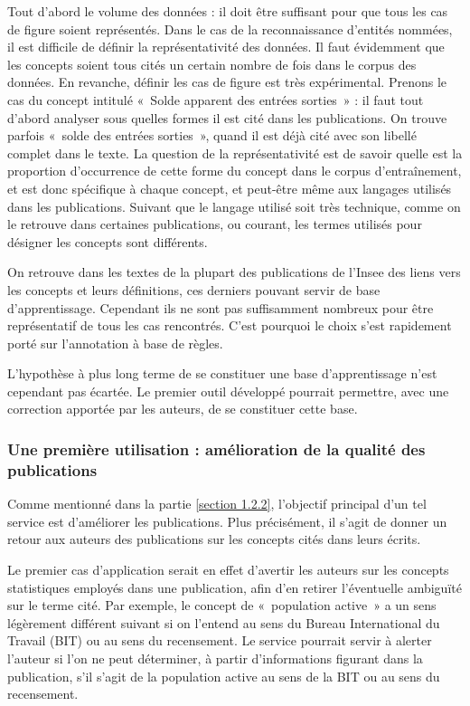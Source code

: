 Tout d'abord le volume des données : il doit être suffisant pour que tous les cas de figure soient représentés. Dans le cas de la reconnaissance d'entités nommées, il est difficile de définir la représentativité des données. Il faut évidemment que les concepts soient tous cités un certain nombre de fois dans le corpus des données. En revanche, définir les cas de figure est très expérimental. Prenons le cas du concept intitulé «~Solde apparent des entrées sorties~» : il faut tout d'abord analyser sous quelles formes il est cité dans les publications. On trouve parfois «~solde des entrées sorties~», quand il est déjà cité avec son libellé complet dans le texte. La question de la représentativité est de savoir quelle est la proportion d'occurrence de cette forme du concept dans le corpus d'entraînement, et est donc spécifique à chaque concept, et peut-être même aux langages utilisés dans les publications. Suivant que le langage utilisé soit très technique, comme on le retrouve dans certaines publications, ou courant, les termes utilisés pour désigner les concepts sont différents.
\newline

On retrouve dans les textes de la plupart des publications de l'Insee des liens vers les concepts et leurs définitions, ces derniers pouvant servir de base d'apprentissage. Cependant ils ne sont pas suffisamment nombreux pour être représentatif de tous les cas rencontrés. C'est pourquoi le choix s'est rapidement porté sur l'annotation à base de règles.
\newline

L'hypothèse à plus long terme de se constituer une base d'apprentissage n'est cependant pas écartée. Le premier outil développé pourrait permettre, avec une correction apportée par les auteurs, de se constituer cette base.
\label{section 2.1.2 - Méthodes de REN}

\subsubsection{Une première utilisation : amélioration de la qualité des publications}
Comme mentionné dans la partie \ref{section 1.2.2}, l'objectif principal d'un tel service est d'améliorer les publications. Plus précisément, il s'agit de donner un retour aux auteurs des publications sur les concepts cités dans leurs écrits. 
\newline

Le premier cas d'application serait en effet d'avertir les auteurs sur les concepts statistiques employés dans une publication, afin d'en retirer l'éventuelle ambiguïté sur le terme cité. Par exemple, le concept de «~population active~» a un sens légèrement différent suivant si on l'entend au sens du Bureau International du Travail (BIT) ou au sens du recensement. Le service pourrait servir à alerter l'auteur si l'on ne peut déterminer, à partir d'informations figurant dans la publication, s'il s'agit de la population active au sens de la BIT ou au sens du recensement.
\newline


